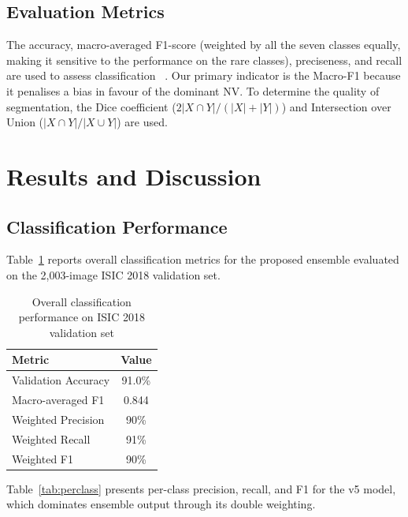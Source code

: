 \documentclass[conference]{IEEEtran}
\begin{document}
\subsection{Evaluation Metrics}

The accuracy, macro-averaged F1-score (weighted by all the seven classes equally, making it sensitive to the performance on the rare classes), preciseness, and recall are used to assess classification ~\cite{wu2022systematic}. Our primary indicator is the Macro-F1 because it penalises a bias in favour of the dominant NV. To determine the quality of segmentation, the Dice coefficient ($2|X\cap Y|/(|X|+|Y|)$) and Intersection over Union ($|X\cap Y|/|X\cup Y|$) are used.

\section{Results and Discussion}
\label{sec:results}

\subsection{Classification Performance}

Table~\ref{tab:classification_results} reports overall classification metrics for the proposed ensemble evaluated on the 2,003-image ISIC 2018 validation set.

\begin{table}[htbp]
\centering
\caption{Overall classification performance on ISIC 2018 validation set}
\label{tab:classification_results}
\begin{tabular}{lc}
\toprule
Metric & Value \\
\midrule
Validation Accuracy & 91.0\% \\
Macro-averaged F1 & 0.844 \\
Weighted Precision & 90\% \\
Weighted Recall & 91\% \\
Weighted F1 & 90\% \\
\bottomrule
\end{tabular}
\end{table}

Table~\ref{tab:perclass} presents per-class precision, recall, and F1 for the v5 model, which dominates ensemble output through its double weighting.
\end{document}
